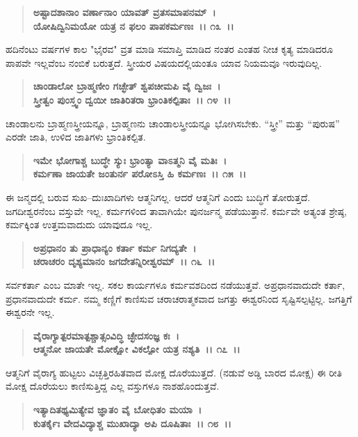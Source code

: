 \begin{verse}
\textbf{ಅಷ್ಟಾದಶಾನಾಂ ವರ್ಣಾನಾಂ ಯಾವತ್‌ ವ್ರತಸಮಾಪನಮ್~।}\\\textbf{ಯೋಷಿದ್ವಿನಿಮಯೋ ಯತ್ರ ನ ಫಲಂ ಪಾಪಕರ್ಮಣಃ~।। ೧೩~।।}
\end{verse}

ಹದಿನೆಂಟು ವರ್ಷಗಳ ಕಾಲ "ಭೈರವ" ವ್ರತ ಮಾಡಿ ಸಮಾಪ್ತಿ ಮಾಡಿದ ನಂತರ ಎಂತಹ ನೀಚ ಕೃತ್ಯ ಮಾಡಿದರೂ ಪಾಪವೇ ಇಲ್ಲವೆಂಬ ನಂಬಿಕೆ ಬರುತ್ತದೆ. ಸ್ತ್ರೀಯರ ವಿಷಯದಲ್ಲಿಯಂತೂ ಯಾವ ನಿಯಮವೂ ಇರುವುದಿಲ್ಲ.

\begin{verse}
\textbf{ಚಾಂಡಾಲೋ ಬ್ರಾಹ್ಮಣೀಂ ಗಚ್ಛೇತ್ ಶ್ವಪಚೀಮಪಿ ವೈ ದ್ವಿಜಃ~।}\\\textbf{ಸ್ತ್ರೀತ್ವಂ ಪುಂಸ್ತ್ವಂ ದ್ವಯೀ ಜಾತಿರಿತರಾ ಭ್ರಾಂತಿಕಲ್ಪಿತಾಃ~।। ೧೪~।।}
\end{verse}

ಚಾಂಡಾಲನು ಬ್ರಾಹ್ಮಣಸ್ತ್ರೀಯನ್ನೂ, ಬ್ರಾಹ್ಮಣನು ಚಾಂಡಾಲಸ್ತ್ರೀಯನ್ನೂ ಭೋಗಿಸಬೇಕು. “ಸ್ತ್ರೀ” ಮತ್ತು “ಪುರುಷ” ಎರಡೇ ಜಾತಿ, ಉಳಿದ ಜಾತಿಗಳು ಭ್ರಾಂತಿಕಲ್ಪಿತ.

\begin{verse}
\textbf{ಇಮೇ ಭೋಗಾಶ್ಚ ಬುದ್ಧೇ ಸ್ಯುಃ ಭ್ರಾಂತ್ಯಾ ವಾಽತ್ಮನಿ ವೈ ಮತಿಃ~।}\\\textbf{ಕರ್ಮಣಾ ಜಾಯತೇ ಜಂತುರ್ನ ಪರೋಽಸ್ತಿ ಹಿ ಕರ್ಮಣಃ~।। ೧೫~।।}
\end{verse}

ಈ ಜನ್ಮದಲ್ಲಿ ಬರುವ ಸುಖ–ದುಃಖಾದಿಗಳು ಆತ್ಮನಿಗಲ್ಲ. ಆದರೆ ಆತ್ಮನಿಗೆ ಎಂದು ಬುದ್ಧಿಗೆ ತೋರುತ್ತದೆ. ಜಗದೀಶ್ವರನೆಂಬ ವಸ್ತುವೇ ಇಲ್ಲ. ಕರ್ಮಗಳಿಂದ ತಾವಾಗಿಯೇ ಪುನರ್ಜನ್ಮ ಪಡೆಯುತ್ತಾನೆ. ಕರ್ಮವೇ ಅತ್ಯಂತ ಶ್ರೇಷ್ಠ, ಕರ್ಮಕ್ಕಿಂತ ಉತ್ತಮವಾದುದು ಯಾವುದೂ ಇಲ್ಲ.

\begin{verse}
\textbf{ಅಪ್ರಧಾನಂ ತು ಪ್ರಾಧಾನ್ಯಂ ಕರ್ತಾ ಕರ್ಮ ನಿಗದ್ಯತೇ~।}\\\textbf{ಚರಾಚರಂ ದೃಶ್ಯಮಾನಂ ಜಗದೇತನ್ನಿರೀಶ್ವರಮ್~।। ೧೬~।।}
\end{verse}

ಸರ್ವಕರ್ತಾ ಎಂಬ ಮಾತೇ ಇಲ್ಲ. ಸಕಲ ಕಾರ್ಯಗಳೂ ಕರ್ಮವಶದಿಂದ ನಡೆಯುತ್ತವೆ. ಅಪ್ರಧಾನವಾದುದೇ ಕರ್ತಾ, ಪ್ರಧಾನವಾದುದೇ ಕರ್ಮ. ನಮ್ಮ ಕಣ್ಣಿಗೆ ಕಾಣಿಸುವ ಚರಾಚರಾತ್ಮಕವಾದ ಜಗತ್ತು ಈಶ್ವರನಿಂದ ಸೃಷ್ಟಿಸಲ್ಪಟ್ಟಿಲ್ಲ. ಜಗತ್ತಿಗೆ ಈಶ್ವರನೇ ಇಲ್ಲ.

\begin{verse}
\textbf{ವೈರಾಗ್ಯಾತ್ಪರಮಾತ್ಪಶ್ಚಾತ್ಸಂವಿದ್ಧಿ ಚ್ಛೇದಸಂಜ್ಞ ಕಃ~।}\\\textbf{ಆತ್ಮನೋ ಜಾಯತೇ ಮೋಕ್ಷೋ ವಿಕಲ್ಪೋ ಯತ್ರ ನಶ್ಯತಿ~।। ೧೭~।।}
\end{verse}

ಆತ್ಮನಿಗೆ ವೈರಾಗ್ಯ ಹುಟ್ಟಲು ವಿಚ್ಛತ್ತಿರಹಿತವಾದ ಮೋಕ್ಷ ದೊರೆಯುತ್ತದೆ. (ನಡುವೆ ಅಡ್ಡಿ ಬಾರದ  ಮೋಕ್ಷ) ಈ ರೀತಿ ಮೋಕ್ಷ ದೊರೆಯಲು ಕಾಣಿಸುತ್ತಿದ್ದ ಎಲ್ಲ ವಸ್ತುಗಳೂ ನಾಶಹೊಂದುತ್ತವೆ.

\begin{verse}
\textbf{ಇತ್ಯಾದಿತಥ್ಯಮಿತ್ಯೇವ ಜ್ಞಾತಂ ವೈ ಬೋಧಿತಂ ಮಯಾ~।}\\\textbf{ಕುತರ್ಕೈಃ ವೇದವಿದ್ಯಾಶ್ಚ ಮುಖಾದ್ಯಾ ಅಪಿ ದೂಷಿತಾಃ~।। ೧೮~।।}
\end{verse}

